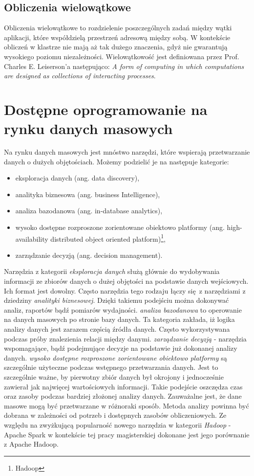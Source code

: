 \subsection{Obliczenia wielowątkowe}
Obliczenia wielowątkowe to rozdzielenie poszczególnych zadań między wątki aplikacji, które współdzielą przestrzeń adresową między sobą. W kontekście obliczeń w klastrze nie mają aż tak dużego znaczenia, gdyż nie gwarantują wysokiego poziomu niezależności. Wielowątkowość jest definiowana przez Prof. Charles E. Leiserson'a następująco: 
\newline \textit{A form of computing in which computations are designed as collections of interacting processes}\cite{mit_presentation}.
\section{Dostępne oprogramowanie na rynku danych masowych}
Na rynku danych masowych jest mnóstwo narzędzi, które wspierają przetwarzanie danych o dużych objętościach. Możemy podzielić je na następuje kategorie:
\begin{itemize}
	\item eksploracja danych (ang. data discovery),
	\item analityka biznesowa (ang. business Intelligence),
	\item analiza bazodanowa (ang. in-database analytics),
	\item wysoko dostępne rozproszone zorientowane obiektowo platformy (ang. high-availability distributed	object oriented platform)\footnote{Hadoop},
	\item zarządzanie decyzją (ang. decision management).    
\end{itemize}
Narzędzia z kategorii \textit{eksploracja danych} służą głównie do wydobywania informacji ze zbiorów danych o dużej objętości na podstawie danych wejściowych. Ich format jest dowolny. Często narzędzia tego rodzaju łączy się z narzędziami z dziedziny \textit{analityki biznesowej}. Dzięki takiemu podejściu można dokonywać analiz, raportów bądź pomiarów wydajności. \textit{analiza bazodanowa} to operowanie na danych masowych po stronie bazy danych. Ta kategoria zakłada, iż logika analizy danych jest zarazem częścią źródła danych. Często wykorzystywana podczas próby znalezienia relacji między danymi. \textit{zarządzanie decyzją} - narzędzia wspomagające, bądź podejmujące decyzje na podstawie już dokonanej analizy danych. \textit{wysoko dostępne rozproszone zorientowane obiektowo platformy} są szczególnie użyteczne podczas wstępnego przetwarzania danych. Jest to szczególnie ważne, by pierwotny zbiór danych był okrojony i jednocześnie zawierał jak najwięcej wartościowych informacji. Takie podejście oszczędza czas oraz zasoby podczas bardziej złożonej analizy danych\cite{big_data_tools}.
\newline Zauważalne jest, że dane masowe mogą być przetwarzane w różnoraki sposób. Metoda analizy powinna być dobrana w zależności od potrzeb i dostępnych zasobów obliczeniowych. Ze względu na zwyżkującą popularność nowego narzędzia w kategorii \textit{Hadoop} - Apache Spark w kontekście tej pracy magisterskiej dokonane jest jego porównanie z Apache Hadoop\cite{databricks_survey}.  
